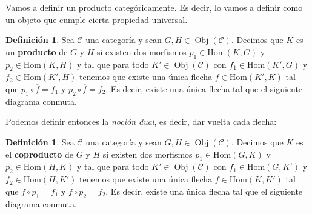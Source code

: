 \documentclass[12pt]{book}
\theoremstyle{definition}
\newtheorem{defn}[teo]{Definición}
\renewcommand{\hom}{\mathrm{Hom}}
\DeclareMathOperator{\Obj}{Obj}
\begin{document}
Vamos a definir un producto categóricamente. Es decir, lo vamos a definir como un objeto que cumple cierta propiedad universal.
\begin{defn}
Sea $\mathcal{C}$ una categoría y sean $G,H\in\Obj(\mathcal{C})$. Decimos que $K$ es un \textbf{producto} de $G$ y $H$ si existen dos morfismos $p_1\in \hom(K,G)$ y $p_2\in \hom(K,H)$ y tal que para todo $K'\in\Obj(\mathcal{C})$ con $f_1\in\hom(K',G)$ y $f_2\in\hom(K',H)$ tenemos que existe una única flecha $\overline{f}\in\hom(K',K)$ tal que $p_1\circ \overline{f}=f_1$ y $p_2\circ \overline{f}=f_2$. Es decir, existe una única flecha tal que el siguiente diagrama conmuta.
\begin{center}
\end{center}
\end{defn}
Podemos definir entonces la \textit{noción dual}, es decir, dar vuelta cada flecha:
\begin{defn}
Sea $\mathcal{C}$ una categoría y sean $G,H\in\Obj(\mathcal{C})$. Decimos que $K$ es el \textbf{coproducto} de $G$ y $H$ si existen dos morfismos $p_1\in \hom(G,K)$ y $p_2\in \hom(H,K)$ y tal que para todo $K'\in\Obj(\mathcal{C})$ con $f_1\in\hom(G,K')$ y $f_2\in\hom(H,K')$ tenemos que existe una única flecha $\overline{f}\in\hom(K,K')$ tal que $\overline{f}\circ p_1=f_1$ y $\overline{f}\circ p_2=f_2$. Es decir, existe una única flecha tal que el siguiente diagrama conmuta.
\begin{center}
\end{center}
\end{defn}
\end{document}
